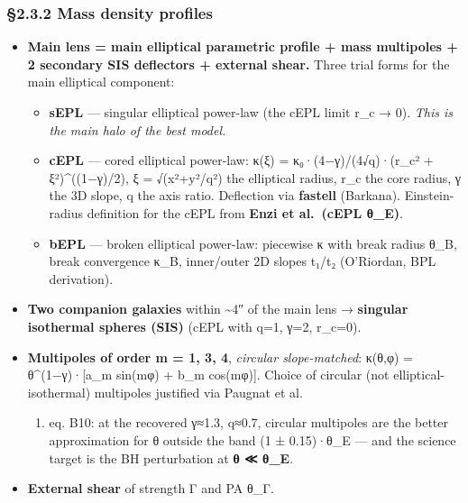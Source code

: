 \documentclass[
]{article}
\providecommand{\tightlist}{%
  \setlength{\itemsep}{0pt}\setlength{\parskip}{0pt}}
\newcommand{\BreakablePath}[1]{{\ttfamily\sloppy #1}}
\begin{document}
\hypertarget{mass-density-profiles}{%
\subsubsection{§2.3.2 Mass density
profiles}\label{mass-density-profiles}}

\begin{itemize}
\tightlist
\item
  \textbf{Main lens = main elliptical parametric profile + mass
  multipoles + 2 secondary SIS deflectors + external shear.} Three trial
  forms for the main elliptical component:

  \begin{itemize}
  \tightlist
  \item
    \textbf{sEPL} --- singular elliptical power-law (the cEPL limit r\_c
    → 0). \emph{This is the main halo of the best model.}
  \item
    \textbf{cEPL} --- cored elliptical power-law: κ(ξ) =
    κ₀·(4−γ)/(4√q)·(r\_c² + ξ²)\^{}((1−γ)/2), ξ = √(x²+y²/q²) the
    elliptical radius, r\_c the core radius, γ the 3D slope, q the axis
    ratio. Deflection via \textbf{\BreakablePath{fastell}} (Barkana).
    Einstein-radius definition for the cEPL from \textbf{Enzi et
    al.~(cEPL θ\_E)}.
  \item
    \textbf{bEPL} --- broken elliptical power-law: piecewise κ with
    break radius θ\_B, break convergence κ\_B, inner/outer 2D slopes
    t₁/t₂ (O'Riordan, BPL derivation).
  \end{itemize}
\item
  \textbf{Two companion galaxies} within \textasciitilde4″ of the main
  lens → \textbf{singular isothermal spheres (SIS)} (cEPL with q=1, γ=2,
  r\_c=0).
\item
  \textbf{Multipoles of order m = 1, 3, 4}, \emph{circular
  slope-matched}: κ(θ,φ) = θ\^{}(1−γ)·{[}a\_m sin(mφ) + b\_m cos(mφ){]}.
  Choice of circular (not elliptical-isothermal) multipoles justified
  via Paugnat et al.

  \begin{enumerate}
  \def\labelenumi{(\arabic{enumi})}
  \setcounter{enumi}{2024}
  \tightlist
  \item
    eq. B10: at the recovered γ≈1.3, q≈0.7, circular multipoles are the
    better approximation for θ outside the band (1 ± 0.15)·θ\_E --- and
    the science target is the BH perturbation at \textbf{θ ≪ θ\_E}.
  \end{enumerate}
\item
  \textbf{External shear} of strength Γ and PA θ\_Γ.
\end{itemize}
\end{document}
